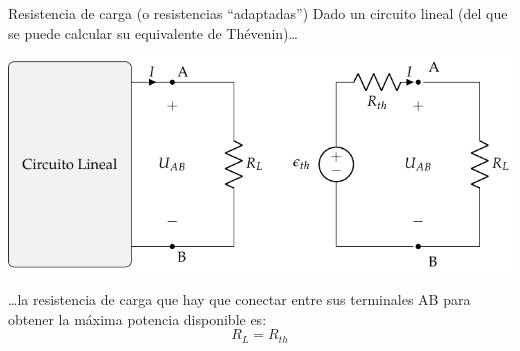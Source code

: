 \documentclass[aspectratio=169, xcolor={usenames,svgnames,dvipsnames}]{beamer}
\begin{document}
\begin{frame}{Resistencia de carga \hspace{3mm}(o resistencias ``adaptadas'')}
    Dado un circuito lineal (del que se puede calcular su equivalente de Thévenin)\ldots{}
    \begin{center}
        \includegraphics[height=0.45\textheight]{../figs/EquivalenteThevenin_R.pdf}
    \end{center}
    
    \ldots{}la \alert{resistencia de carga} que hay que conectar entre sus terminales AB para obtener la máxima potencia disponible es:
    \[
      \boxed{R_L = R_{th}}
    \]
\end{frame}

\end{document}
